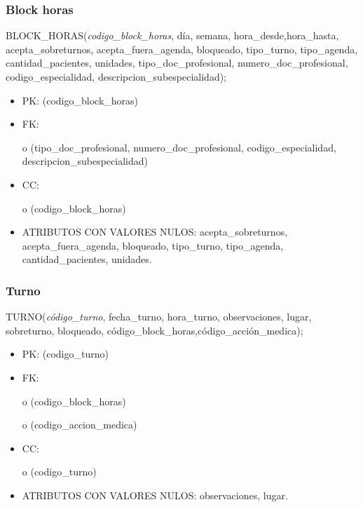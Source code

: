 \documentclass[a4paper,11pt]{article}
\begin{document}
\subsubsection{\textbf{Block horas}}

BLOCK\_HORAS(\emph{codigo\_block\_horas}, día, semana, hora\_desde,hora\_hasta, 
acepta\_sobreturnos, acepta\_fuera\_agenda, bloqueado, tipo\_turno, tipo\_agenda, 
cantidad\_pacientes, unidades,\emph{ }tipo\_doc\_profesional, numero\_doc\_profesional, 
codigo\_especialidad, descripcion\_subespecialidad);

\begin{itemize}
\item PK: (codigo\_block\_horas)

\item FK: 

o (tipo\_doc\_profesional, numero\_doc\_profesional, codigo\_especialidad, descripcion\_subespecialidad)

\item CC:

o (codigo\_block\_horas)

\item ATRIBUTOS CON VALORES NULOS: acepta\_sobreturnos, acepta\_fuera\_agenda, bloqueado, 
tipo\_turno, tipo\_agenda, cantidad\_pacientes, unidades.\label{HToc293405841}
\end{itemize}

\subsubsection{\textbf{Turno}}

TURNO(\emph{código\_turno}, fecha\_turno, hora\_turno, observaciones, lugar, sobreturno, 
bloqueado, código\_block\_horas,código\_acción\_medica);

\begin{itemize}
\item PK: (codigo\_turno)

\item FK: 

o (codigo\_block\_horas)

o (codigo\_accion\_medica)

\item CC:

o (codigo\_turno)

\item ATRIBUTOS CON VALORES NULOS:  observaciones, lugar.\label{HToc293405842}
\end{itemize}
\end{document}
